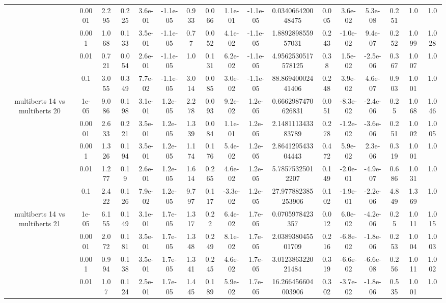 \begin{tabular}{|c|c|c|c|c|c|c|c|c|c|c|c|c|c|c|c|c|}
 & 0.0001 & 2.295 & 0.225 & 3.6e-01 & -1.1e-05 & 0.933 & 0.066 & 1.1e-01 & -1.1e-05 & 0.034066420048475 & 0.005 & 3.6e-02 & 5.3e-08 & 0.251 & 1.0 & 1.0 \\
 & 0.001 & 1.068 & 0.133 & 3.5e-01 & -1.1e-05 & 0.77 & 0.052 & 4.1e-02 & -1.1e-05 & 1.889289855957031 & 0.243 & -1.0e-02 & 9.4e-07 & 0.252 & 1.099 & 1.028 \\
 & 0.01 & 0.721 & 0.054 & 2.6e-01 & -1.1e-05 & 1.0 & 0.131 & 6.2e-02 & -1.1e-05 & 4.9562530517578125 & 0.38 & 1.5e-02 & -2.5e-06 & 0.367 & 1.007 & 1.0 \\
 & 0.1 & 3.055 & 0.349 & 7.7e-02 & -1.1e-05 & 3.014 & 0.085 & 3.0e-02 & -1.1e-05 & 88.86940002441406 & 0.248 & 3.9e-02 & 4.6e-07 & 0.903 & 1.001 & 1.0 \\
\hline
\multirow{5}{*}{multiberts 14 vs multiberts 20} & 1e-05 & 9.086 & 0.198 & 3.1e-01 & 1.2e-05 & 2.278 & 0.093 & 9.2e-02 & 1.2e-05 & 0.6662987470626831 & 0.051 & -8.3e-02 & -2.4e-06 & 0.25 & 1.068 & 1.046 \\
 & 0.0001 & 2.633 & 0.221 & 3.5e-01 & 1.2e-05 & 1.339 & 0.084 & 1.1e-01 & 1.2e-05 & 2.148111343383789 & 0.278 & -1.2e-02 & -3.6e-06 & 0.251 & 1.002 & 1.005 \\
 & 0.001 & 1.326 & 0.194 & 3.5e-01 & 1.2e-05 & 1.174 & 0.176 & 5.4e-02 & 1.2e-05 & 2.864129543304443 & 0.472 & 5.9e-02 & 2.3e-06 & 0.319 & 1.001 & 1.0 \\
 & 0.01 & 1.277 & 0.19 & 2.6e-01 & 1.2e-05 & 1.614 & 0.265 & 4.6e-02 & 1.2e-05 & 5.78575325012207 & 0.149 & -2.0e-01 & -4.9e-07 & 0.686 & 1.031 & 1.0 \\
 & 0.1 & 2.422 & 0.126 & 7.9e-02 & 1.2e-05 & 9.797 & 0.117 & -3.3e-02 & 1.2e-05 & 27.977882385253906 & 0.102 & -1.9e-01 & -2.2e-06 & 4.849 & 1.369 & 1.0 \\
\hline
\multirow{5}{*}{multiberts 14 vs multiberts 21} & 1e-05 & 6.155 & 0.149 & 3.1e-01 & 1.7e-05 & 1.317 & 0.22 & 6.4e-02 & 1.7e-05 & 0.0705978423357 & 0.012 & 6.0e-02 & -4.2e-06 & 0.25 & 1.011 & 1.015 \\
 & 0.0001 & 2.072 & 0.181 & 3.5e-01 & 1.7e-05 & 1.348 & 0.249 & 8.1e-02 & 1.7e-05 & 2.038938045501709 & 0.216 & -6.8e-02 & -1.8e-06 & 0.253 & 1.004 & 1.003 \\
 & 0.001 & 0.994 & 0.138 & 3.5e-01 & 1.7e-05 & 1.341 & 0.245 & 4.6e-02 & 1.7e-05 & 3.012386322021484 & 0.319 & -6.6e-02 & -6.6e-08 & 0.256 & 1.011 & 1.002 \\
 & 0.01 & 1.07 & 0.124 & 2.5e-01 & 1.7e-05 & 1.445 & 0.189 & 5.9e-02 & 1.7e-05 & 16.266456604003906 & 0.302 & -3.7e-02 & -1.8e-06 & 0.535 & 1.001 & 1.0 \\

\end{tabular}
